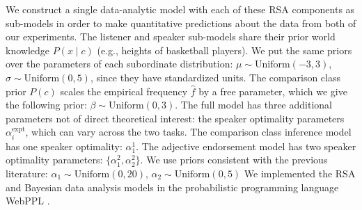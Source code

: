 \documentclass[doc]{apa6}
\begin{document}
We construct a single data-analytic model with each of these RSA components as sub-models in order to make quantitative predictions about the data from both of our experiments.
The listener and speaker sub-models share their prior world knowledge $P(x \mid c)$ (e.g., heights of basketball players).
We put the same priors over the parameters of each subordinate distribution: $\mu \sim \text{Uniform}(-3, 3)$, $\sigma \sim \text{Uniform}(0, 5)$, since they have standardized units.
The comparison class prior $P(c)$ scales the empirical frequency $\hat{f}$ by a free parameter, which we give the following prior: $\beta \sim \text{Uniform}(0, 3)$. 
The full model has three additional parameters not of direct theoretical interest: the speaker optimality parameters $\alpha^\text{expt}_{i}$, which can vary across the two tasks.
The comparison class inference model has one speaker optimality: $\alpha^\text{1}_{1}$.
The adjective endorsement model has two speaker optimality parameters: 
$\{\alpha^\text{2}_{1}, \alpha^\text{2}_{2}\}$.
We use priors consistent with the previous literature: $\alpha_1 \sim \text{Uniform}(0, 20)$, $\alpha_2 \sim \text{Uniform}(0, 5)$
We implemented the RSA and Bayesian data analysis models in the probabilistic programming language WebPPL \cite{dippl}.
\end{document}
